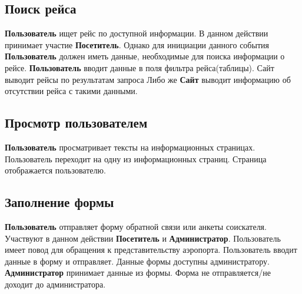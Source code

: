 \subsection{Поиск рейса}
\textbf{Пользователь} ищет рейс по доступной информации.
В данном действии принимает участие \textbf{Посетитель}.
Однако для инициации данного события \textbf{Пользователь}
должен иметь данные, необходимые для поиска информации о
рейсе. \textbf{Пользователь} вводит данные в поля фильтра
рейса(таблицы). Сайт выводит рейсы по результатам запроса
Либо же \textbf{Сайт} выводит информацию об отсутствии
рейса с такими данными.

\subsection{Просмотр пользователем}
\textbf{Пользователь} просматривает тексты на информационных
страницах. Пользователь переходит на одну из информационных
страниц. Страница отображается пользователю.

\subsection{Заполнение формы}
\textbf{Пользователь} отправляет форму обратной связи или
анкеты соискателя. Участвуют в данном действии
\textbf{Посетитель} и \textbf{Администратор}.
Пользователь имеет повод для обращения к представительству
аэропорта. Пользователь вводит данные в форму и отправляет.
Данные формы доступны администратору. \textbf{Администратор}
принимает данные из формы. Форма не отправляется/не
доходит до администратора.

